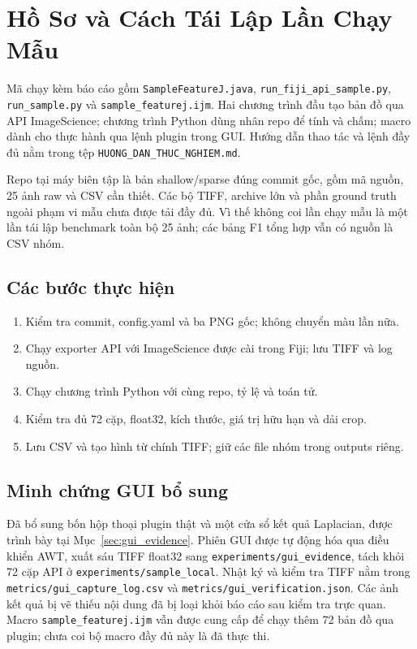 \appendices
\section{Hồ Sơ và Cách Tái Lập Lần Chạy Mẫu}
Mã chạy kèm báo cáo gồm \texttt{SampleFeatureJ.java}, \texttt{run\_fiji\_api\_sample.py},
\texttt{run\_sample.py} và \texttt{sample\_featurej.ijm}.
Hai chương trình đầu tạo bản đồ qua API ImageScience; chương trình Python dùng
nhân repo để tính và chấm; macro dành cho thực hành qua lệnh plugin trong GUI.
Hướng dẫn thao tác và lệnh đầy đủ nằm trong tệp \texttt{HUONG\_DAN\_THUC\_NGHIEM.md}.

Repo tại máy biên tập là bản shallow/sparse đúng commit gốc, gồm mã nguồn,
25 ảnh raw và CSV cần thiết. Các bộ TIFF, archive lớn và phần ground truth ngoài
phạm vi mẫu chưa được tải đầy đủ. Vì thế không coi lần chạy mẫu là một lần
tái lập benchmark toàn bộ 25 ảnh; các bảng F1 tổng hợp vẫn có nguồn là CSV nhóm.

\subsection{Các bước thực hiện}
\begin{enumerate}
\item Kiểm tra commit, config.yaml và ba PNG gốc; không chuyển màu lần nữa.
\item Chạy exporter API với ImageScience được cài trong Fiji; lưu TIFF và log nguồn.
\item Chạy chương trình Python với cùng repo, tỷ lệ và toán tử.
\item Kiểm tra đủ 72 cặp, float32, kích thước, giá trị hữu hạn và dải crop.
\item Lưu CSV và tạo hình từ chính TIFF; giữ các file nhóm trong outputs riêng.
\end{enumerate}

\subsection{Minh chứng GUI bổ sung}
Đã bổ sung bốn hộp thoại plugin thật và một cửa sổ kết quả Laplacian,
được trình bày tại Mục~\ref{sec:gui_evidence}. Phiên GUI được tự động hóa
qua điều khiển AWT, xuất sáu TIFF float32 sang
\texttt{experiments/gui\_evidence}, tách khỏi 72 cặp API ở
\texttt{experiments/sample\_local}. Nhật ký và kiểm tra TIFF nằm trong
\texttt{metrics/gui\_capture\_log.csv} và
\texttt{metrics/gui\_verification.json}. Các ảnh kết quả bị vẽ thiếu nội dung
đã bị loại khỏi báo cáo sau kiểm tra trực quan.
Macro \texttt{sample\_featurej.ijm} vẫn được cung cấp để chạy thêm
72 bản đồ qua plugin; chưa coi bộ macro đầy đủ này là đã thực thi.

